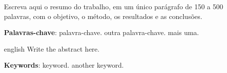 \documentclass[
  12pt,
  openany,       %
  oneside,       %
  a4paper,
  english,       %
  brazil         %
]{abntex2}
\begin{document}
\frenchspacing

\imprimircapa
\imprimirfolhaderosto

\begin{resumo}
  Escreva aqui o resumo do trabalho, em um único parágrafo de 150 a 500 palavras, com o
  objetivo, o método, os resultados e as conclusões.

  \textbf{Palavras-chave}: palavra-chave. outra palavra-chave. mais uma.
\end{resumo}

\begin{resumo}[Abstract]
  \begin{otherlanguage*}{english}
    Write the abstract here.

    \vspace{\onelineskip}
    \noindent
    \textbf{Keywords}: keyword. another keyword.
  \end{otherlanguage*}
\end{resumo}

\listoffigures*
\cleardoublepage

\listoftables*
\cleardoublepage

\tableofcontents*
\cleardoublepage

\textual





\postextual


\end{document}
